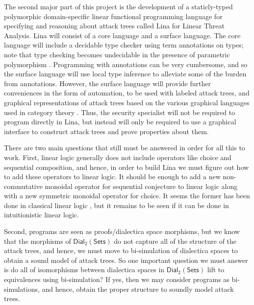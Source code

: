 \documentclass{llncs}
\newcommand{\dial}[0]{\mathsf{Dial_2}(\mathsf{Sets})}
\begin{document}
The second major part of this project is the development of a
staticly-typed polymorphic domain-specific linear functional
programming language for specifying and reasoning about attack trees
called Lina for Linear Threat Analysis.  Lina will consist of a core
language and a surface language.  The core language will include a
decidable type checker using term annotations on types; note that type
checking becomes undecidable in the presence of parametric
polymorphism \cite{Wells:1999}.  Programming with annotations can be
very cumbersome, and so the surface language will use local type
inference \cite{Pierce:2000} to alleviate some of the burden from
annotations.  However, the surface language will provide further
conveniences in the form of automation, to be used with labeled attack
trees, and graphical representations of attack trees based on the
various graphical languages used in category theory
\cite{Selinger:2009}.  Thus, the security specialist will not be
required to program directly in Lina, but instead will only be
required to use a graphical interface to construct attack trees and
prove properties about them.

There are two main questions that still must be answered in order for
all this to work.  First, linear logic generally does not include
operators like choice and sequential composition, and hence, in order
to build Lina we must figure out how to add these operators to linear
logic.  It should be enough to add a new non-commutative monoidal
operator for sequential conjecture to linear logic along with a new
symmetric monoidal operator for choice.  It seems the former has been
done in classical linear logic \cite{?}, but it remains to be seen if
it can be done in intuitionistic linear logic.

Second, programs are seen as proofs/dialectica space morphisms, but we
know that the morphisms of $\dial$ do not capture all of the structure
of the attack trees, and hence, we must move to bi-simulation of
dialectica spaces to obtain a sound model of attack trees.  So one
important question we must answer is do all of isomorphisms between
dialectica spaces in $\dial$ lift to equivalences using bi-simulation?
If yes, then we may consider programs as bi-simulations, and hence,
obtain the proper structure to soundly model attack trees.
\end{document}
